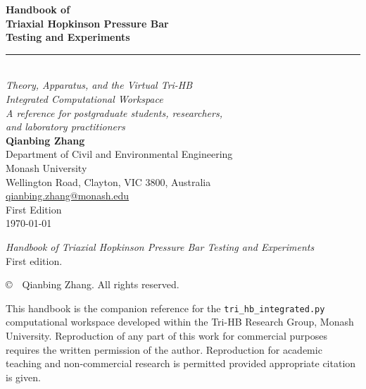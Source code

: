 \documentclass[11pt,a4paper,openany]{book}
\theoremstyle{handbook}
\begin{document}
\frontmatter

\thispagestyle{empty}
\begin{titlepage}
\centering
\vspace*{2cm}

{\Huge\bfseries\color{deepblue} Handbook of}\\[6pt]
{\Huge\bfseries\color{deepblue} Triaxial Hopkinson Pressure Bar}\\[6pt]
{\Huge\bfseries\color{deepblue} Testing and Experiments}\\[14pt]

{\color{rulegrey}\rule{0.7\textwidth}{0.6pt}}\\[14pt]

{\Large\itshape Theory, Apparatus, and the Virtual Tri-HB\\
Integrated Computational Workspace}\\[10pt]

{\Large\itshape A reference for postgraduate students, researchers,\\
and laboratory practitioners}\\[40pt]

{\Large\bfseries Qianbing Zhang}\\[6pt]
{\normalsize Department of Civil and Environmental Engineering}\\
{\normalsize Monash University}\\
{\normalsize Wellington Road, Clayton, VIC 3800, Australia}\\
{\normalsize\href{mailto:qianbing.zhang@monash.edu}{qianbing.zhang@monash.edu}}\\[60pt]

\vfill
{\large First Edition}\\[6pt]
{\normalsize \today}
\end{titlepage}

\thispagestyle{empty}
\null\vfill
\noindent\textit{Handbook of Triaxial Hopkinson Pressure Bar Testing and Experiments}\\
First edition.

\bigskip
\noindent\copyright\ \the\year\ Qianbing Zhang. All rights reserved.

\bigskip
\noindent This handbook is the companion reference for the
\texttt{tri\_hb\_integrated.py} computational workspace developed within the
Tri-HB Research Group, Monash University. Reproduction of any part of this
work for commercial purposes requires the written permission of the author.
Reproduction for academic teaching and non-commercial research is permitted
provided appropriate citation is given.
\end{document}
